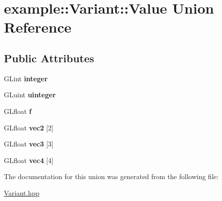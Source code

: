 \hypertarget{unionexample_1_1_variant_1_1_value}{}\section{example\+::Variant\+::Value Union Reference}
\label{unionexample_1_1_variant_1_1_value}
\subsection*{Public Attributes}
\begin{DoxyCompactItemize}
\item 
\mbox{\label{unionexample_1_1_variant_1_1_value_a48bc818d88030ff56e6f07014f1d9ad7}} 
G\+Lint {\bfseries integer}
\item 
\mbox{\label{unionexample_1_1_variant_1_1_value_aedf4016832db4bf2d1ce5d2263756cc0}} 
G\+Luint {\bfseries uinteger}
\item 
\mbox{\label{unionexample_1_1_variant_1_1_value_a0eb0639514df1ca4fcfe62ad38eaed6a}} 
G\+Lfloat {\bfseries f}
\item 
\mbox{\label{unionexample_1_1_variant_1_1_value_a018470c0884fff937570c427270c0f69}} 
G\+Lfloat {\bfseries vec2} \mbox{[}2\mbox{]}
\item 
\mbox{\label{unionexample_1_1_variant_1_1_value_a534a95b8e0539b73343893d6f3941bea}} 
G\+Lfloat {\bfseries vec3} \mbox{[}3\mbox{]}
\item 
\mbox{\label{unionexample_1_1_variant_1_1_value_af64feabbed9de226db9d8dd74406152e}} 
G\+Lfloat {\bfseries vec4} \mbox{[}4\mbox{]}
\end{DoxyCompactItemize}


The documentation for this union was generated from the following file\+:\begin{DoxyCompactItemize}
\item 
\mbox{\hyperlink{_variant_8hpp}{Variant.\+hpp}}\end{DoxyCompactItemize}
